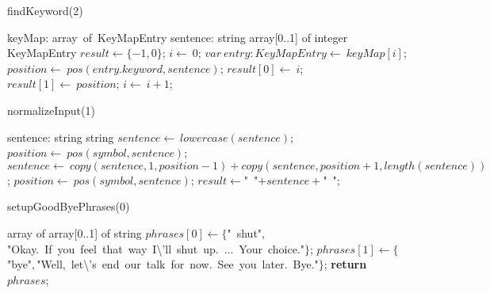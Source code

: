 \documentclass[a4paper,10pt]{article}
\begin{document}
\begin{algorithm}
\caption{findKeyword(2)}
\begin{algorithmic}[5]
\State {}
\State {}
\State {}
\State {}
\State {}
\State {}
    \State keyMap: array\ of\ KeyMapEntry
    \State sentence: string
  \EndDecl
    \State array[0..1] of integer
  \EndDecl
    \State KeyMapEntry
  \EndDecl
  \State \(result\gets\{-1,0\}\);
  \State \(i\gets\ 0\);
    \State \(var\ entry:KeyMapEntry\gets\ keyMap[i]\);
    \State \(position\gets\ pos(entry.keyword,sentence)\);
      \State \(result[0]\gets\ i\);
      \State \(result[1]\gets\ position\);
    \EndIf
    \State \(i\gets\ i+1\);
  \EndWhile
\EndFunction
\end{algorithmic}
\end{algorithm}


\begin{algorithm}
\caption{normalizeInput(1)}
\begin{algorithmic}[5]
\State {}
\State {}
\State {}
    \State sentence: string
  \EndDecl
    \State string
  \EndDecl
  \State \(sentence\gets\ lowercase(sentence)\);
    \State \(position\gets\ pos(symbol,sentence)\);
      \State \(sentence\gets\ copy(sentence,1,position-1)+copy(sentence,position+1,length(sentence))\);
      \State \(position\gets\ pos(symbol,sentence)\);
    \EndWhile
  \EndFor
  \State \(result\gets\)"{}\ "{}\(+sentence+\)"{}\ "{}\(\);
\EndFunction
\end{algorithmic}
\end{algorithm}


\begin{algorithm}
\caption{setupGoodByePhrases(0)}
\begin{algorithmic}[5]
    \State array of array[0..1] of string
  \EndDecl
  \State \(phrases[0]\gets\{\)"{}\ shut"{}\(,\)"{}Okay.\ If\ you\ feel\ that\ way\ I\textbackslash{}'{}ll\ shut\ up.\ ...\ Your\ choice."{}\(\}\);
  \State \(phrases[1]\gets\{\)"{}bye"{}\(,\)"{}Well,\ let\textbackslash{}'{}s\ end\ our\ talk\ for\ now.\ See\ you\ later.\ Bye."{}\(\}\);
  \State \textbf{return} \(phrases\);
\EndFunction
\end{algorithmic}
\end{algorithm}
\end{document}
